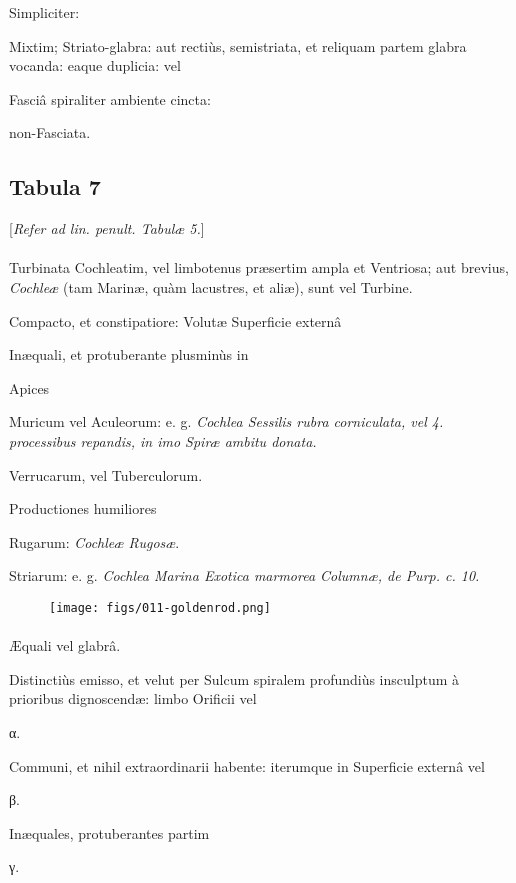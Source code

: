 \documentclass[a4paper, 11pt, oneside, polutonikogreek, german]{article}
\begin{document}
Simpliciter:

Mixtim; Striato-glabra: aut rectiùs, semistriata, et reliquam partem glabra vocanda: eaque duplicia: vel

Fasciâ spiraliter ambiente cincta:

non-Fasciata.
\clearpage
\subsection{Tabula 7}
\begin{center}
[\emph{Refer ad lin. penult. Tabulæ 5.}]
\end{center}
\paragraph{}
Turbinata Cochleatim, vel limbotenus præsertim ampla et Ventriosa; aut brevius, \emph{Cochleæ} (tam Marinæ, quàm lacustres, et aliæ), sunt vel Turbine.

Compacto, et constipatiore: Volutæ Superficie externâ

Inæquali, et protuberante plusminùs in

Apices

Muricum vel Aculeorum: e. g. \emph{Cochlea Sessilis rubra corniculata, vel 4. processibus repandis, in imo Spiræ ambitu donata.}

Verrucarum, vel Tuberculorum.

Productiones humiliores

Rugarum: \emph{Cochleæ Rugosæ}.

Striarum: e. g. \emph{Cochlea Marina Exotica marmorea Columnæ, de Purp. c. 10.}

\begin{figure}[H]
\centering
\texttt{[image: figs/011-goldenrod.png]}
\end{figure}
\paragraph{}
Æquali vel glabrâ.

Distinctiùs emisso, et velut per Sulcum spiralem profundiùs insculptum à prioribus dignoscendæ: limbo Orificii vel

α.

Communi, et nihil extraordinarii habente: iterumque in Superficie externâ vel

β.

Inæquales, protuberantes partim

γ.
\end{document}
